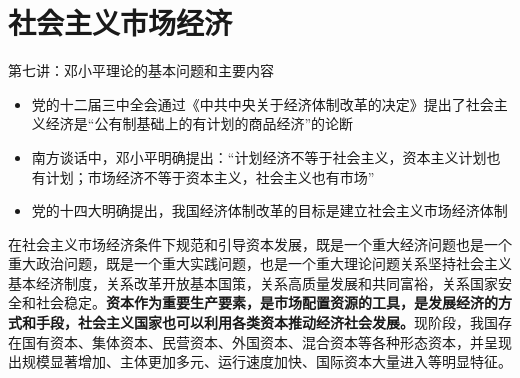 \documentclass[12pt,openany]{ctexbook}
\begin{document}
\section{社会主义市场经济}
第七讲：邓小平理论的基本问题和主要内容
\begin{itemize}
  \item 党的十二届三中全会通过《中共中央关于经济体制改革的决定》提出了社会主义经济是“公有制基础上的有计划的商品经济”的论断
  \item 南方谈话中，邓小平明确提出：“计划经济不等于社会主义，资本主义计划也有计划；市场经济不等于资本主义，社会主义也有市场”
  \item 党的十四大明确提出，我国经济体制改革的目标是建立社会主义市场经济体制
\end{itemize}
在社会主义市场经济条件下规范和引导资本发展，既是一个重大经济问题也是一个重大政治问题，既是一个重大实践问题，也是一个重大理论问题关系坚持社会主义基本经济制度，关系改革开放基本国策，关系高质量发展和共同富裕，关系国家安全和社会稳定。\textbf{资本作为重要生产要素，是市场配置资源的工具，是发展经济的方式和手段，社会主义国家也可以利用各类资本推动经济社会发展。}现阶段，我国存在国有资本、集体资本、民营资本、外国资本、混合资本等各种形态资本，并呈现出规模显著增加、主体更加多元、运行速度加快、国际资本大量进入等明显特征。
\end{document}
